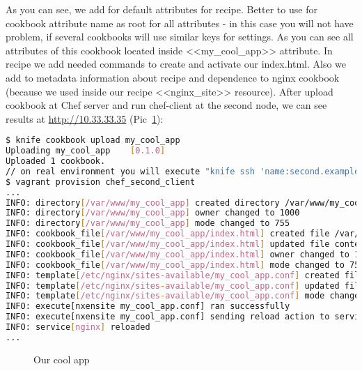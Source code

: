 As you can see, we add for default attributes for recipe. Better to use for cookbook attribute name as root for all attributes - in this case you will not have problem, if several cookbooks will use similar keys for settings. As you can see all attributes of this cookbook located inside <<my\_cool\_app>> attribute. In recipe we add needed commands to create and activate our index.html. Also we add to metadata information about recipe and dependence to nginx cookbook (because we used inside our recipe <<nginx\_site>> resource). After upload cookbook at Chef server and run chef-client at the second node, we can see results at \href{http://10.33.33.35}{http://10.33.33.35} (Pic~\ref{fig:my_cool_app_index}):

\begin{lstlisting}[language=Bash,label=lst:cookbook-attributes8]
$ knife cookbook upload my_cool_app
Uploading my_cool_app    [0.1.0]
Uploaded 1 cookbook.
// on real environment you will execute "knife ssh 'name:second.example.com' 'sudo chef-client' -i ../keys/production.pem -x ubuntu"
$ vagrant provision chef_second_client
...
INFO: directory[/var/www/my_cool_app] created directory /var/www/my_cool_app
INFO: directory[/var/www/my_cool_app] owner changed to 1000
INFO: directory[/var/www/my_cool_app] mode changed to 755
INFO: cookbook_file[/var/www/my_cool_app/index.html] created file /var/www/my_cool_app/index.html
INFO: cookbook_file[/var/www/my_cool_app/index.html] updated file contents /var/www/my_cool_app/index.html
INFO: cookbook_file[/var/www/my_cool_app/index.html] owner changed to 1000
INFO: cookbook_file[/var/www/my_cool_app/index.html] mode changed to 755
INFO: template[/etc/nginx/sites-available/my_cool_app.conf] created file /etc/nginx/sites-available/my_cool_app.conf
INFO: template[/etc/nginx/sites-available/my_cool_app.conf] updated file contents /etc/nginx/sites-available/my_cool_app.conf
INFO: template[/etc/nginx/sites-available/my_cool_app.conf] mode changed to 644
INFO: execute[nxensite my_cool_app.conf] ran successfully
INFO: execute[nxensite my_cool_app.conf] sending reload action to service[nginx] (delayed)
INFO: service[nginx] reloaded
...
\end{lstlisting}

\begin{figure}[ht!]
  \caption{Our cool app}
  \label{fig:my_cool_app_index}
\end{figure}